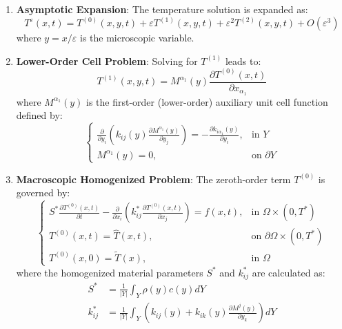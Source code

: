 \documentclass[11pt]{article}
\begin{document}
\begin{enumerate}
    \item \textbf{Asymptotic Expansion}: The temperature solution is expanded as:
    \begin{equation}
    T^{\varepsilon}(x,t) = T^{(0)}(x,y,t) + \varepsilon T^{(1)}(x,y,t) + \varepsilon^2 T^{(2)}(x,y,t) + O(\varepsilon^3)
    \end{equation}
    where $y = x/\varepsilon$ is the microscopic variable.
    
    \item \textbf{Lower-Order Cell Problem}: Solving for $T^{(1)}$ leads to:
    \begin{equation}
    T^{(1)}(x,y,t) = M^{\alpha_1}(y)\frac{\partial T^{(0)}(x,t)}{\partial x_{\alpha_1}}
    \end{equation}
    where $M^{\alpha_1}(y)$ is the first-order (lower-order) auxiliary unit cell function defined by:
    \begin{equation}
    \begin{cases}
    \frac{\partial}{\partial y_i}\left(k_{ij}(y)\frac{\partial M^{\alpha_1}(y)}{\partial y_j}\right) = -\frac{\partial k_{i\alpha_1}(y)}{\partial y_i}, & \text{in } Y \\
    M^{\alpha_1}(y) = 0, & \text{on } \partial Y
    \end{cases}
    \end{equation}
    
    \item \textbf{Macroscopic Homogenized Problem}: The zeroth-order term $T^{(0)}$ is governed by:
    \begin{equation}
    \begin{cases}
    S^*\frac{\partial T^{(0)}(x,t)}{\partial t} - \frac{\partial}{\partial x_i}\left(k^*_{ij}\frac{\partial T^{(0)}(x,t)}{\partial x_j}\right) = f(x,t), & \text{in } \Omega \times (0,T^*) \\
    T^{(0)}(x,t) = \hat{T}(x,t), & \text{on } \partial\Omega \times (0,T^*) \\
    T^{(0)}(x,0) = \tilde{T}(x), & \text{in } \Omega
    \end{cases}
    \end{equation}
    where the homogenized material parameters $S^*$ and $k^*_{ij}$ are calculated as:
    \begin{equation}
    \begin{aligned}
    S^* &= \frac{1}{|Y|}\int_Y \rho(y)c(y)dY \\
    k^*_{ij} &= \frac{1}{|Y|}\int_Y \left(k_{ij}(y) + k_{ik}(y)\frac{\partial M^j(y)}{\partial y_k}\right)dY
    \end{aligned}
    \end{equation}
    

\end{enumerate}
\end{document}
